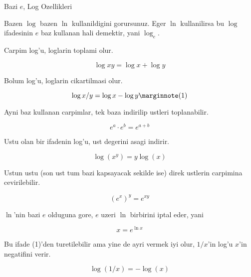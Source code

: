 \documentclass[12pt,fleqn]{article}\usepackage{../common}
\begin{document}
Bazi $e$, Log Ozellikleri

Bazen $\log$ bazen $\ln$ kullanildigini gorursunuz. Eger $\ln$
kullanilirsa bu $\log$ ifadesinin $e$ baz kullanan hali demektir, yani
$\log_e$. 

Carpim log'u, loglarin toplami olur.

\[ \log xy = \log x + \log y \]

Bolum log'u, loglarin cikartilmasi olur.

\[ \log x/y = \log x - \log y  
\mlabel{1}
\]

Ayni baz kullanan carpimlar, tek baza indirilip ustleri toplanabilir.

\[ e^a \cdot e^b = e^{a+b} \]

Ustu olan bir ifadenin log'u, ust degerini asagi indirir.

\[ \log(x^y) = y \log(x) \]

Ustun ustu (son ust tum bazi kapsayacak sekilde ise) direk ustlerin
carpimina cevirilebilir.

\[ (e^x)^y = e^{xy} \]

$\ln$'nin bazi $e$ olduguna gore, $e$ uzeri $\ln$ birbirini iptal eder,
yani

\[ x = e^{\ln x} \]

Bu ifade (1)'den turetilebilir ama yine de ayri vermek iyi olur, $1/x$'in
log'u $x$'in negatifini verir. 

\[ \log(1/x) = -\log(x) \]
\end{document}
